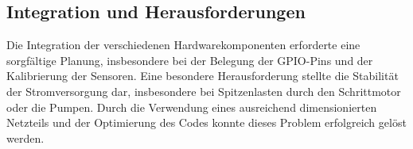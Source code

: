 \subsection{Integration und Herausforderungen}
Die Integration der verschiedenen Hardwarekomponenten erforderte eine sorgfältige Planung, insbesondere bei der Belegung der GPIO-Pins und der Kalibrierung der Sensoren. Eine besondere Herausforderung stellte die Stabilität der Stromversorgung dar, insbesondere bei Spitzenlasten durch den Schrittmotor oder die Pumpen. Durch die Verwendung eines ausreichend dimensionierten Netzteils und der Optimierung des Codes konnte dieses Problem erfolgreich gelöst werden.
